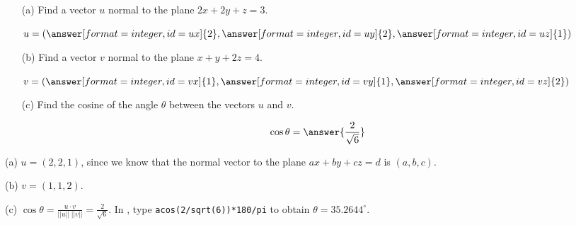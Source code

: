 \documentclass{ximera}
\begin{document}
\begin{exercise} \label{c2.2.9}
\begin{itemize}
\item[(a)] Find a vector $u$ normal to the plane $2x+2y+z=3$.
  \begin{prompt}
    \begin{validator}[(ux==uy) && (uy==2*uz) && (uy != 0)]
      \(
        u = \left( \answer[format=integer,id=ux]{2}, \answer[format=integer,id=uy]{2}, \answer[format=integer,id=uz]{1} \right)
      \)
    \end{validator}
  \end{prompt}
\item[(b)] Find a vector $v$ normal to the plane $x+y+2z=4$.
  \begin{prompt}
    \begin{validator}[(vx==vy) && (2*vy==vz) && (vy != 0)]
      \(
        v = \left( \answer[format=integer,id=vx]{1}, \answer[format=integer,id=vy]{1}, \answer[format=integer,id=vz]{2} \right)
      \)
    \end{validator}
  \end{prompt}
\item[(c)] Find the cosine of the angle $\theta$ between the vectors $u$ and $v$.
  \begin{prompt}
    \[
      \cos \theta = \answer{\frac{2}{\sqrt{6}}}
    \]
  \end{prompt}
\end{itemize}

\begin{solution}

(a) $u = (2,2,1)$, since we know that the normal vector to the plane
$ax + by + cz = d$ is $(a,b,c)$.

(b) $v = (1,1,2)$.

(c) $\cos\theta = \frac{u \cdot v}{||u||\;||v||} = \frac{2}{\sqrt{6}}$.
In \Matlabp, type {\tt acos(2/sqrt(6))*180/pi} to obtain $\theta =
35.2644^\circ$.

\end{solution}
\end{exercise}

\CEXER
\end{document}
